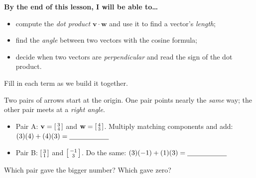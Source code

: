 \documentclass[10pt]{article}
\newcommand{\vv}{\mathbf{v}}
\newcommand{\ww}{\mathbf{w}}
\begin{document}

\vspace{0.12in}

\begin{objectivebox}
\textbf{By the end of this lesson, I will be able to\dots}
\begin{itemize}\setlength{\itemsep}{2pt}
  \item compute the \emph{dot product} $\vv\cdot\ww$ and use it to find a vector's \emph{length};
  \item find the \emph{angle} between two vectors with the cosine formula;
  \item decide when two vectors are \emph{perpendicular} and read the sign of the dot product.
\end{itemize}
\end{objectivebox}

\vspace{0.10in}

\begin{vocabbox}
\small
Fill in each term as we build it together.
\par\vspace{2pt}
\end{vocabbox}

\begin{hookbox}
Two pairs of arrows start at the origin. One pair points nearly the \emph{same} way; the other
pair meets at a \emph{right angle}.
\begin{itemize}\setlength{\itemsep}{1pt}
  \item Pair A: $\vv=\begin{bsmallmatrix} 3\\4 \end{bsmallmatrix}$ and $\ww=\begin{bsmallmatrix} 4\\3 \end{bsmallmatrix}$.
        Multiply matching components and add: $(3)(4)+(4)(3)=\blank{2.0cm}$
  \item Pair B: $\begin{bsmallmatrix} 3\\1 \end{bsmallmatrix}$ and $\begin{bsmallmatrix} -1\\3 \end{bsmallmatrix}$.
        Do the same: $(3)(-1)+(1)(3)=\blank{2.0cm}$
\end{itemize}
Which pair gave the bigger number? Which gave zero? \writeline
\end{hookbox}
\end{document}
